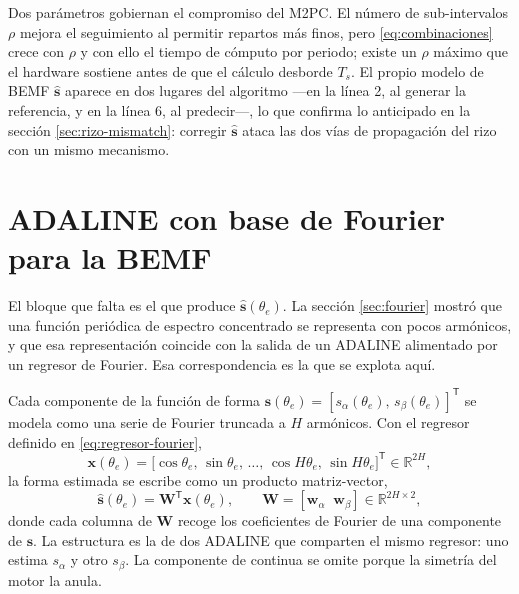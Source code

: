 \documentclass[../../../Tesis_JALS_Maestria.tex]{subfiles}
\begin{document}
Dos parámetros gobiernan el compromiso del M2PC. El número de sub-intervalos $\rho$ mejora el seguimiento al permitir repartos más finos, pero \eqref{eq:combinaciones} crece con $\rho$ y con ello el tiempo de cómputo por periodo; existe un $\rho$ máximo que el hardware sostiene antes de que el cálculo desborde $T_s$. El propio modelo de BEMF $\hat{\mathbf{s}}$ aparece en dos lugares del algoritmo ---en la línea 2, al generar la referencia, y en la línea 6, al predecir---, lo que confirma lo anticipado en la sección \ref{sec:rizo-mismatch}: corregir $\hat{\mathbf{s}}$ ataca las dos vías de propagación del rizo con un mismo mecanismo.

\section{ADALINE con base de Fourier para la BEMF}
\label{sec:adaline-bemf}

El bloque que falta es el que produce $\hat{\mathbf{s}}(\theta_e)$. La sección \ref{sec:fourier} mostró que una función periódica de espectro concentrado se representa con pocos armónicos, y que esa representación coincide con la salida de un ADALINE alimentado por un regresor de Fourier. Esa correspondencia es la que se explota aquí.

Cada componente de la función de forma $\mathbf{s}(\theta_e) = [s_\alpha(\theta_e),\,s_\beta(\theta_e)]^{\mathsf T}$ se modela como una serie de Fourier truncada a $H$ armónicos. Con el regresor definido en \eqref{eq:regresor-fourier},
\[
    \mathbf{x}(\theta_e) = \bigl[\cos\theta_e,\,\sin\theta_e,\,\ldots,\,\cos H\theta_e,\,\sin H\theta_e\bigr]^{\mathsf T} \in \mathbb{R}^{2H},
\]
la forma estimada se escribe como un producto matriz-vector,
\begin{equation}
    \hat{\mathbf{s}}(\theta_e) = \mathbf{W}^{\mathsf T}\mathbf{x}(\theta_e),
    \qquad \mathbf{W} = [\mathbf{w}_\alpha\;\;\mathbf{w}_\beta] \in \mathbb{R}^{2H\times 2},
    \label{eq:adaline-bemf}
\end{equation}
donde cada columna de $\mathbf{W}$ recoge los coeficientes de Fourier de una componente de $\mathbf{s}$. La estructura es la de dos ADALINE que comparten el mismo regresor: uno estima $s_\alpha$ y otro $s_\beta$. La componente de continua se omite porque la simetría del motor la anula.
\end{document}
